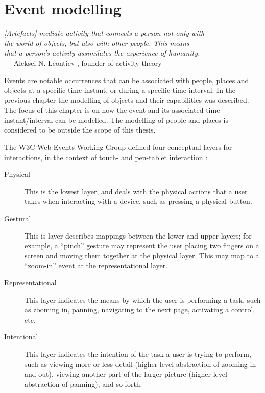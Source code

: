 \chapter{Event modelling}
\label{EventModelling}

\begin{flushright}{\slshape    
[Artefacts] mediate activity that connects a person not only with \\
 the world of objects, but also with other people. This means \\
that a person's activity assimilates the experience of humanity.} \\ \medskip
    ---  Aleksei N. Leontiev \cite{InteractionDe}, founder of activity theory
\end{flushright}


Events are notable occurrences that can be associated with people, places and objects at a specific time instant, or during a specific time interval. In the previous chapter the modelling of objects and their capabilities was described. The focus of this chapter is on how the event and its associated time instant/interval can be modelled. The modelling of people and places is considered to be outside the scope of this thesis.



The W3C Web Events Working Group defined four conceptual layers for interactions, in the context of touch- and pen-tablet interaction \cite{w3cevents}:

\begin{description}
\item [Physical] This is the lowest layer, and deals with the physical actions that a user takes when interacting with a device, such as pressing a physical button.
\item [Gestural] This is layer describes mappings between the lower and upper layers; for example, a ``pinch'' gesture may represent the user placing two fingers on a screen and moving them together at the physical layer. This may map to a ``zoom-in'' event at the representational layer.
\item [Representational] This layer indicates the means by which the user is performing a task, such as zooming in, panning, navigating to the next page, activating a control, etc.
\item [Intentional] This layer indicates the intention of the task a user is trying to perform, such as viewing more or less detail (higher-level abstraction of zooming in and out), viewing another part of the larger picture (higher-level abstraction of panning), and so forth.
\end{description}


